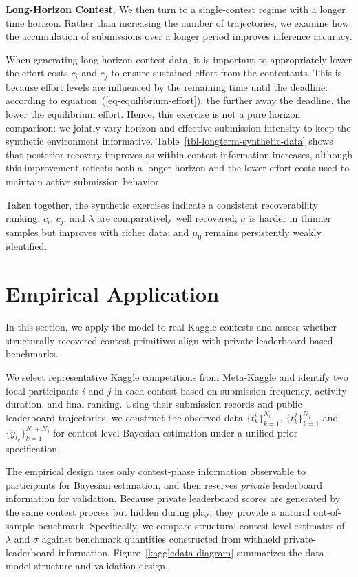 \documentclass[mnsc]{informs3}
\begin{document}
\textbf{Long-Horizon Contest.}
We then turn to a single-contest regime with a longer time horizon.
Rather than increasing the number of trajectories, we examine how the accumulation of submissions over a longer period improves inference accuracy.

When generating long-horizon contest data, it is important to appropriately lower the effort costs $c_i$ and $c_j$ to ensure sustained effort from the contestants.
This is because effort levels are influenced by the remaining time until the deadline:
according to equation~(\ref{eq-equilibrium-effort}), the further away the deadline, the lower the equilibrium effort.
Hence, this exercise is not a pure horizon comparison: we jointly vary horizon and effective submission intensity to keep the synthetic environment informative.
Table~\ref{tbl-longterm-synthetic-data} shows that posterior recovery improves as within-contest information increases, although this improvement reflects both a longer horizon and the lower effort costs used to maintain active submission behavior.

Taken together, the synthetic exercises indicate a consistent recoverability ranking: $c_i$, $c_j$, and $\lambda$ are comparatively well recovered; $\sigma$ is harder in thinner samples but improves with richer data; and $\mu_0$ remains persistently weakly identified.




\section{Empirical Application}
\label{sec-kaggle-application}

In this section, we apply the model to real Kaggle contests and assess whether structurally recovered contest primitives align with private-leaderboard-based benchmarks.

We select representative Kaggle competitions from Meta-Kaggle and identify two focal participants $i$ and $j$ in each contest based on submission frequency, activity duration, and final ranking.
Using their submission records and public leaderboard trajectories, we construct the observed data $\{t^i_k\}^{N_i}_{k=1}$, $\{t^j_k\}^{N_j}_{k=1}$ and $\{\hat{y}_{t_k}\}_{k=1}^{N_i+N_j}$ for contest-level Bayesian estimation under a unified prior specification.

The empirical design uses only contest-phase information observable to participants for Bayesian estimation, and then reserves \textit{private} leaderboard information for validation.
Because private leaderboard scores are generated by the same contest process but hidden during play, they provide a natural out-of-sample benchmark.
Specifically, we compare structural contest-level estimates of $\lambda$ and $\sigma$ against benchmark quantities constructed from withheld private-leaderboard information.
Figure~\ref{kaggledata-diagram} summarizes the data-model structure and validation design.
\end{document}
